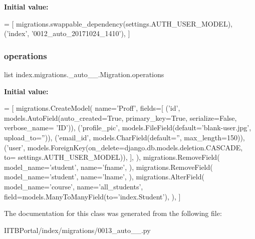 {\bfseries Initial value\+:}
\begin{DoxyCode}
=  [
        migrations.swappable\_dependency(settings.AUTH\_USER\_MODEL),
        (\textcolor{stringliteral}{'index'}, \textcolor{stringliteral}{'0012\_auto\_20171024\_1410'}),
    ]
\end{DoxyCode}
\mbox{\label{classindex_1_1migrations_1_10013__auto__20171024__1456_1_1Migration_ab448e38042074478863862f26d3c41cc}} 
\subsubsection{\texorpdfstring{operations}{operations}}
{\footnotesize\ttfamily list index.\+migrations.\+\_\+auto\+\_\+\_.\+Migration.\+operations\hspace{0.3cm}{\ttfamily [static]}}

{\bfseries Initial value\+:}
\begin{DoxyCode}
=  [
        migrations.CreateModel(
            name=\textcolor{stringliteral}{'Proff'},
            fields=[
                (\textcolor{stringliteral}{'id'}, models.AutoField(auto\_created=\textcolor{keyword}{True}, primary\_key=\textcolor{keyword}{True}, serialize=\textcolor{keyword}{False}, verbose\_name=\textcolor{stringliteral}{
      'ID'})),
                (\textcolor{stringliteral}{'profile\_pic'}, models.FileField(default=\textcolor{stringliteral}{'blank-user.jpg'}, upload\_to=\textcolor{stringliteral}{''})),
                (\textcolor{stringliteral}{'email\_id'}, models.CharField(default=\textcolor{stringliteral}{''}, max\_length=150)),
                (\textcolor{stringliteral}{'user'}, models.ForeignKey(on\_delete=django.db.models.deletion.CASCADE, to=
      settings.AUTH\_USER\_MODEL)),
            ],
        ),
        migrations.RemoveField(
            model\_name=\textcolor{stringliteral}{'student'},
            name=\textcolor{stringliteral}{'fname'},
        ),
        migrations.RemoveField(
            model\_name=\textcolor{stringliteral}{'student'},
            name=\textcolor{stringliteral}{'lname'},
        ),
        migrations.AlterField(
            model\_name=\textcolor{stringliteral}{'course'},
            name=\textcolor{stringliteral}{'all\_students'},
            field=models.ManyToManyField(to=\textcolor{stringliteral}{'index.Student'}),
        ),
    ]
\end{DoxyCode}


The documentation for this class was generated from the following file\+:\begin{DoxyCompactItemize}
\item 
I\+I\+T\+B\+Portal/index/migrations/0013\+\_\+auto\+\_\+\_.\+py\end{DoxyCompactItemize}
